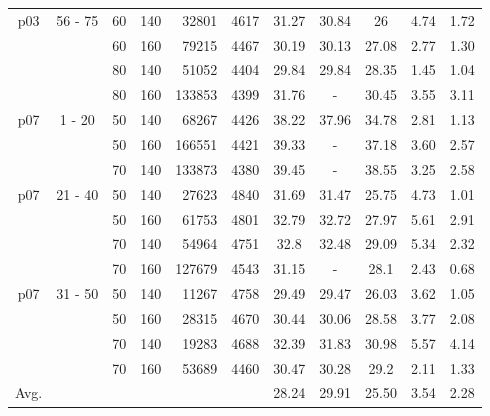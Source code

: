 \documentclass[11pt]{article}
\begin{document}
\begin{table}[h]
{\begin {tabular}[t]{|c|c|c|c|r|c|c|c|c|c|c|}
p03 & 56 - 75	& 60	& 140	& 32801	& 4617	& 31.27	& 30.84	&	26	& 4.74	&	1.72	\\
    & & 60	& 160	& 79215	& 4467	& 30.19	& 30.13	&	27.08	& 2.77	&	1.30	\\
    & & 80	& 140	& 51052	& 4404	& 29.84	& 29.84	&	28.35	& 1.45	&	1.04	\\
    & & 80	& 160	& 133853 & 4399	& 31.76	& \mbox{-}	& 30.45	& 3.55	&	3.11	\\\hline
p07 & 1 - 20 & 50	& 140	& 68267	& 4426	& 38.22	& 37.96	&	34.78	& 2.81	&	1.13	\\
    &	& 50	& 160	& 166551 & 4421	& 39.33	& \mbox{-}	& 37.18	& 3.60	&	2.57	\\
    & & 70	& 140	& 133873 & 4380	& 39.45	& \mbox{-}	& 38.55	& 3.25	&	2.58	\\\hline
p07 & 21 - 40 	& 50	& 140	& 27623	& 4840	& 31.69	& 31.47	&	25.75	& 4.73	&	1.01	\\
    & & 50	& 160	& 61753	& 4801	& 32.79	& 32.72	&	27.97	& 5.61	&	2.91	\\
    & & 70	& 140	& 54964	& 4751	& 32.8	& 32.48	&	29.09	& 5.34	&	2.32	\\
    & & 70	& 160	& 127679 & 4543	& 31.15	& \mbox{-}	& 28.1	& 2.43	&	0.68	\\\hline
p07 & 31 - 50 	& 50	& 140	& 11267	& 4758	& 29.49	& 29.47	&	26.03	& 3.62	&	1.05	\\
    & & 50	& 160	& 28315	& 4670	& 30.44	& 30.06	&	28.58	& 3.77	&	2.08	\\
    & & 70	& 140	& 19283	& 4688	& 32.39	& 31.83	&	30.98	& 5.57	&	4.14	\\
    & & 70	& 160	& 53689	& 4460	& 30.47	& 30.28	&	29.2	& 2.11	&	1.33	\\\hline
Avg. &   &  &  &  &  & 28.24   & 29.91 &  25.50  &  3.54 &   2.28   \\\hline       
\end{tabular}}
\end{table} 
\end{document}
